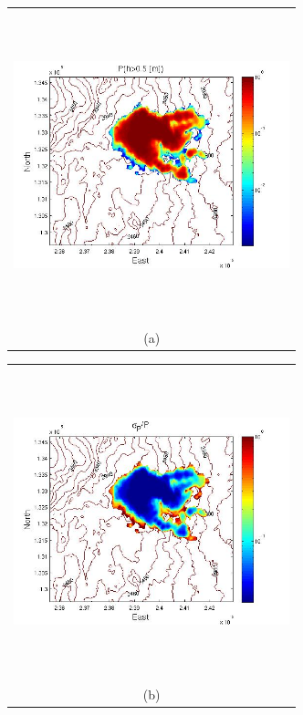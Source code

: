 \documentclass[12pt]{article}
\newcommand{\Pic}[2][0.85]{\begin{center}\texttt{[image: \#2]}
 \end{center} }
\begin{document}
\begin{figure}[H]
      \begin{minipage}[b]{0.6\textwidth}
        \begin{tabular}{c}
       \includegraphics[width=8cm,height=9cm,keepaspectratio]{Galeras_Aster30_P.jpg}\\
        (a)
        \end{tabular}
    \end{minipage}
    \begin{minipage}{0.6\textwidth}
        \begin{tabular}{c}
	\includegraphics[width=8cm,height=9cm,keepaspectratio]{Galeras_Aster30_sigma.jpg}\\
        (b)

\end{tabular}
\end{minipage}
\end{figure}
\end{document}
